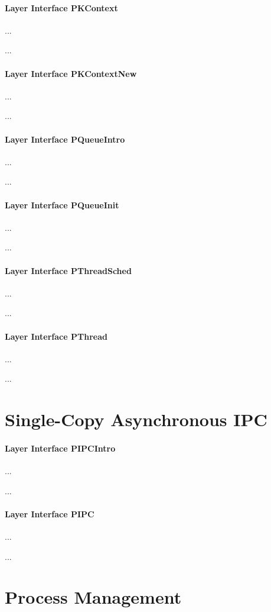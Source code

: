 \paragraph{Layer Interface PKContext}
...

...

\paragraph{Layer Interface PKContextNew}
...

...

\paragraph{Layer Interface PQueueIntro}
...

...

\paragraph{Layer Interface PQueueInit}
...

...

\paragraph{Layer Interface PThreadSched}
...

...

\paragraph{Layer Interface PThread}
...

...

\section{Single-Copy Asynchronous IPC}

\paragraph{Layer Interface PIPCIntro}
...

...

\paragraph{Layer Interface PIPC}
...

...

\section{Process Management}

